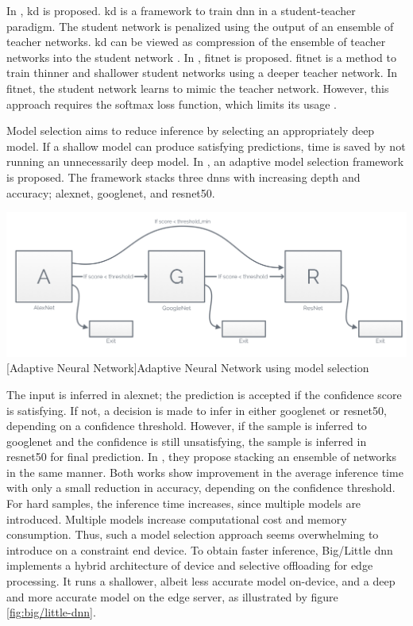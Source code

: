 \begin{enumdescript}
	In \cite{hinton_distilling_2015}, \gls{kd} is proposed. \gls{kd} is a framework to train \gls{dnn} in a student-teacher paradigm. The student network is penalized using the output of an ensemble of teacher networks. \gls{kd} can be viewed as compression of the ensemble of teacher networks into the student network \cite{cheng_survey_2017}. 
	In \cite{romero_fitnets:_2014}, \gls{fitnet} is proposed. \gls{fitnet} is a method to train thinner and shallower student networks using a deeper teacher network. In \gls{fitnet}, the student network learns to mimic the teacher network. However, this approach requires the softmax loss function, which limits its usage \cite{cheng_survey_2017}.  
	
	\item[Model Selection] Model selection aims to reduce inference by selecting an appropriately deep model. If a shallow model can produce satisfying predictions, time is saved by not running an unnecessarily deep model. In \cite{bolukbasi_adaptive_2017}, an adaptive model selection framework is proposed. The framework stacks three \gls{dnn}s with increasing depth and accuracy; \gls{alexnet}, \gls{googlenet}, and \gls{resnet}50. 
	
	\begin{minipage}[t]{\linewidth}
		\centering                           
		\includegraphics[width=.8\linewidth]{figures/models/adaptive}
		[Adaptive Neural Network]{Adaptive Neural Network using model selection}
	\end{minipage}
	
	The input is inferred in \gls{alexnet}; the prediction is accepted if the confidence score is satisfying. If not, a decision is made to infer in either \gls{googlenet} or \gls{resnet}50, depending on a confidence threshold. However, if the sample is inferred to \gls{googlenet} and the confidence is still unsatisfying, the sample is inferred in \gls{resnet}50 for final prediction. In \cite{tann_flexible_2018}, they propose stacking an ensemble of networks in the same manner. Both works show improvement in the average inference time with only a small reduction in accuracy, depending on the confidence threshold. For hard samples, the inference time increases, since multiple models are introduced. Multiple models increase computational cost and memory consumption. Thus, such a model selection approach seems overwhelming to introduce on a constraint end device. 	
	To obtain faster inference, Big/Little \gls{dnn} \cite{park_big/little_2015} implements a hybrid architecture of device and selective offloading for edge processing. It runs a shallower, albeit less accurate model on-device, and a deep and more accurate model on the edge server, as illustrated by figure \ref{fig:big/little-dnn}. 
	

\end{enumdescript}
